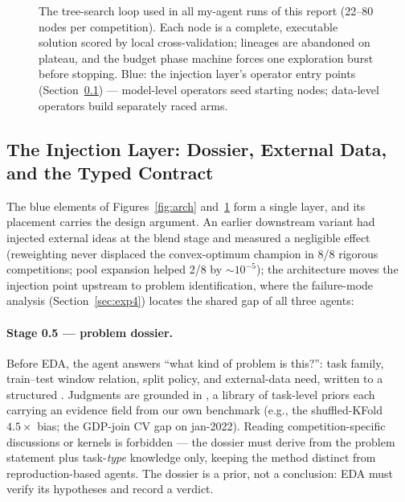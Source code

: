 \documentclass[11pt,a4paper]{article}
\begin{document}
\begin{figure}[htbp]
\caption{The tree-search loop used in all my-agent runs of this report (22--80 nodes per
competition). Each node is a complete, executable solution scored by local cross-validation;
lineages are abandoned on plateau, and the budget phase machine forces one exploration burst
before stopping. Blue: the injection layer's operator entry points (Section~\ref{sec:v5}) ---
model-level operators seed starting nodes; data-level operators build separately raced arms.}
\label{fig:tree}
\end{figure}

\subsection{The Injection Layer: Dossier, External Data, and the Typed Contract}
\label{sec:v5}

The blue elements of Figures~\ref{fig:arch} and~\ref{fig:tree} form a single layer, and its placement carries the design argument. An earlier downstream variant had injected external ideas at the blend stage and measured a negligible effect (reweighting never displaced the convex-optimum champion in 8/8 rigorous competitions; pool expansion helped 2/8 by ${\sim}10^{-5}$); the architecture moves the injection point upstream to problem identification, where the failure-mode analysis (Section~\ref{sec:exp4}) locates the shared gap of all three agents:

\paragraph{Stage 0.5 --- problem dossier.} Before EDA, the agent answers ``what kind of problem is this?'': task family, train--test window relation, split policy, and external-data need, written to a structured . Judgments are grounded in , a library of task-level priors each carrying an evidence field from our own benchmark (e.g., the shuffled-KFold $4.5\times$ bias; the GDP-join CV gap on jan-2022). Reading competition-specific discussions or kernels is forbidden --- the dossier must derive from the problem statement plus task-\emph{type} knowledge only, keeping the method distinct from reproduction-based agents. The dossier is a prior, not a conclusion: EDA must verify its hypotheses and record a verdict.
\end{document}
